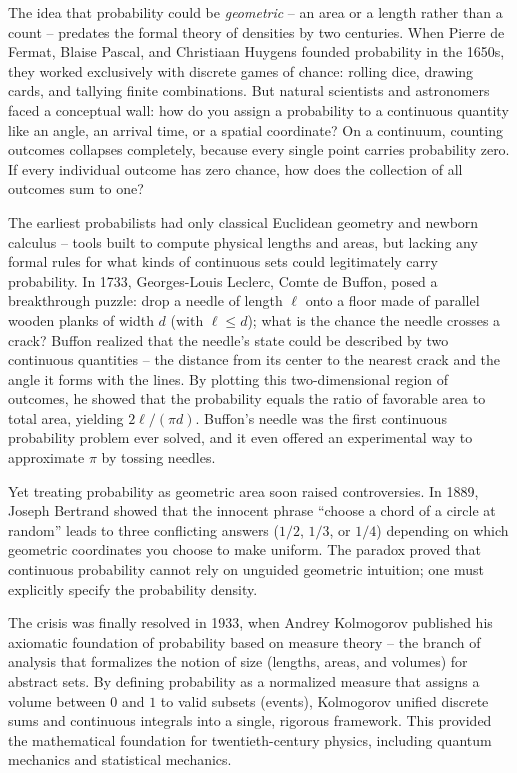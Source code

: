 \begin{historybox}
The idea that probability could be \emph{geometric} -- an area or a length rather
than a count -- predates the formal theory of densities by two centuries. When
Pierre de Fermat, Blaise Pascal, and Christiaan Huygens founded probability in the
1650s, they worked exclusively with discrete games of chance: rolling dice, drawing
cards, and tallying finite combinations. But natural scientists and astronomers
faced a conceptual wall: how do you assign a probability to a continuous quantity
like an angle, an arrival time, or a spatial coordinate? On a continuum, counting
outcomes collapses completely, because every single point carries probability zero.
If every individual outcome has zero chance, how does the collection of all outcomes
sum to one?

The earliest probabilists had only classical Euclidean geometry and newborn
calculus -- tools built to compute physical lengths and areas, but lacking any
formal rules for what kinds of continuous sets could legitimately carry probability.
In 1733, Georges-Louis Leclerc, Comte de Buffon, posed a breakthrough puzzle:
drop a needle of length $\ell$ onto a floor made of parallel wooden planks of width
$d$ (with $\ell \le d$); what is the chance the needle crosses a crack? Buffon
realized that the needle's state could be described by two continuous quantities --
the distance from its center to the nearest crack and the angle it forms with the
lines. By plotting this two-dimensional region of outcomes, he showed that the
probability equals the ratio of favorable area to total area, yielding $2\ell/(\pi d)$.
Buffon's needle was the first continuous probability problem ever solved, and it
even offered an experimental way to approximate $\pi$ by tossing needles.

Yet treating probability as geometric area soon raised controversies.
In 1889, Joseph Bertrand showed that the innocent phrase ``choose a chord of a circle
at random'' leads to three conflicting answers ($1/2$, $1/3$, or $1/4$) depending on
which geometric coordinates you choose to make uniform. The paradox proved that
continuous probability cannot rely on unguided geometric intuition; one must
explicitly specify the probability density.

The crisis was finally resolved in 1933, when Andrey Kolmogorov published his
axiomatic foundation of probability based on measure theory -- the branch of
analysis that formalizes the notion of size (lengths, areas, and volumes) for
abstract sets. By defining probability as a normalized measure that assigns a volume
between $0$ and $1$ to valid subsets (events), Kolmogorov unified discrete sums and
continuous integrals into a single, rigorous framework. This provided
the mathematical foundation for twentieth-century physics, including quantum mechanics
and statistical mechanics.


\end{historybox}
